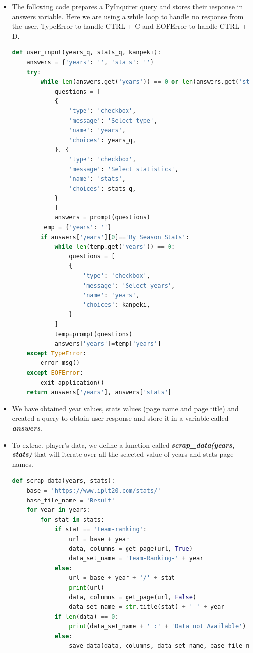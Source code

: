 \documentclass[12pt]{article}
\begin{document}
\begin{itemize}
		\item The following code prepares a PyInquirer query and stores their response in answers variable. Here we are using a while loop to handle no response from the user, TypeError to handle CTRL + C and EOFError to handle CTRL + D.
		
		\begin{lstlisting}[language=Python]
def user_input(years_q, stats_q, kanpeki):
    answers = {'years': '', 'stats': ''}
	try:
		while len(answers.get('years')) == 0 or len(answers.get('stats')) == 0:
			questions = [
			{
				'type': 'checkbox',
				'message': 'Select type',
				'name': 'years',
				'choices': years_q,
			}, {
				'type': 'checkbox',
				'message': 'Select statistics',
				'name': 'stats',
				'choices': stats_q,
			}
			]
			answers = prompt(questions)
		temp = {'years': ''}
		if answers['years'][0]=='By Season Stats':
			while len(temp.get('years')) == 0:
				questions = [
				{
					'type': 'checkbox',
					'message': 'Select years',
					'name': 'years',
					'choices': kanpeki,
				}
			]
			temp=prompt(questions)
			answers['years']=temp['years']
	except TypeError:
		error_msg()
	except EOFError:
		exit_application()
	return answers['years'], answers['stats']
		\end{lstlisting}
	
	\item We have obtained year values, stats values (page name and page title) and created a query to obtain user response and store it in a variable called \textbf{\textit{answers}}.
	
	\item To extract player’s data, we define a function called \textbf{\textit{scrap\_data(years, stats)}} that will iterate over all the selected value of years and stats page names.
	
	\begin{lstlisting}[language=Python]
def scrap_data(years, stats):
	base = 'https://www.iplt20.com/stats/'
	base_file_name = 'Result'
	for year in years:
		for stat in stats:
			if stat == 'team-ranking':
				url = base + year
				data, columns = get_page(url, True)
				data_set_name = 'Team-Ranking-' + year
			else:
				url = base + year + '/' + stat
				print(url)
				data, columns = get_page(url, False)
				data_set_name = str.title(stat) + '-' + year
			if len(data) == 0:
				print(data_set_name + ' :' + 'Data not Available')
			else:
				save_data(data, columns, data_set_name, base_file_name)
	\end{lstlisting}


\end{itemize}
\end{document}
